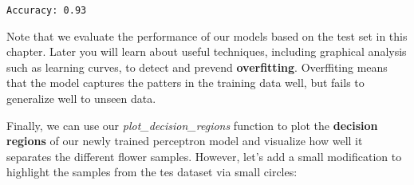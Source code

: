 \documentclass[11pt]{article}
\begin{document}
    \begin{Verbatim}[commandchars=\\\{\}]
Accuracy: 0.93

    \end{Verbatim}

    Note that we evaluate the performance of our models based on the test
set in this chapter. Later you will learn about useful techniques,
including graphical analysis such as learning curves, to detect and
prevend \textbf{overfitting}. Overffiting means that the model captures
the patters in the training data well, but fails to generalize well to
unseen data.

    Finally, we can use our \emph{plot\_decision\_regions} function to plot
the \textbf{decision regions} of our newly trained perceptron model and
visualize how well it separates the different flower samples. However,
let's add a small modification to highlight the samples from the tes
dataset via small circles:
\end{document}
